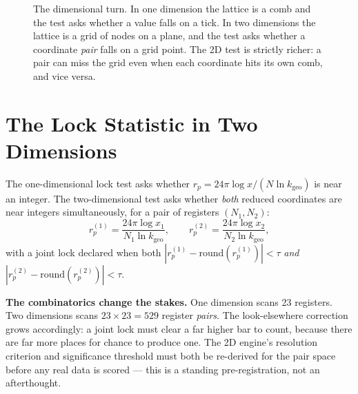 \documentclass[11pt, letterpaper, openany]{book}
\newcommand{\kgeo}{k_{\mathrm{geo}}}
\begin{document}
\begin{figure}[H]
\centering
{}
\caption{The dimensional turn. In one dimension the lattice is a comb and the test asks whether a
value falls on a tick. In two dimensions the lattice is a grid of nodes on a plane, and the test
asks whether a coordinate \emph{pair} falls on a grid point. The 2D test is strictly richer: a
pair can miss the grid even when each coordinate hits its own comb, and vice versa.}
\end{figure}

\section{The Lock Statistic in Two Dimensions}

The one-dimensional lock test asks whether $r_p = 24\pi \log x / (N\ln\kgeo)$ is near an integer.
The two-dimensional test asks whether \emph{both} reduced coordinates are near integers
simultaneously, for a pair of registers $(N_1, N_2)$:
\[
r_p^{(1)} = \frac{24\pi \log x_1}{N_1 \ln\kgeo}, \qquad
r_p^{(2)} = \frac{24\pi \log x_2}{N_2 \ln\kgeo},
\]
with a joint lock declared when both $|r_p^{(1)} - \mathrm{round}(r_p^{(1)})| < \tau$ \emph{and}
$|r_p^{(2)} - \mathrm{round}(r_p^{(2)})| < \tau$.

\begin{warningbox}
\textbf{The combinatorics change the stakes.} One dimension scans 23 registers. Two dimensions
scans $23 \times 23 = 529$ register \emph{pairs}. The look-elsewhere correction grows
accordingly: a joint lock must clear a far higher bar to count, because there are far more places
for chance to produce one. The 2D engine's resolution criterion and significance threshold must
both be re-derived for the pair space before any real data is scored --- this is a standing
pre-registration, not an afterthought.
\end{warningbox}
\end{document}
